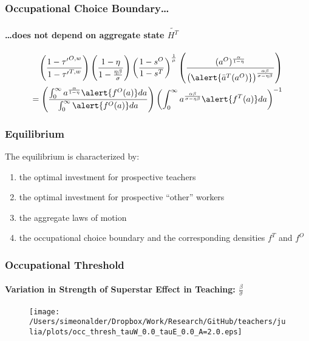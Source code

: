 \documentclass[11pt]{beamer}
\begin{document}

\begin{frame}
\frametitle{Occupational Choice Boundary\ldots}
\framesubtitle{\ldots does not depend on aggregate state $\widetilde{H^T}$} 
\begin{align}
\left(\frac{1-{\tau'}^{O,w}}{1-{\tau'}^{T,w}}\right) \left(\frac{1-\eta}{1-\tfrac{\eta\beta}{\sigma}}\right)  \left(\frac{1-s^{O}}{1-s^{T}}\right)^{\frac{1}{\mu}}  \left(\frac{(a^O)^\frac{\alpha}{1-\eta}}{\big(\alert{\bar{a}^T(a^O)}\big)^\frac{\alpha\beta}{\sigma-\eta\beta}}\right) \nonumber\\
= \left(\frac{\int_0^\infty a^\frac{\alpha}{1-\eta} \alert{f^O(a)} da}{\int_0^\infty \alert{f^O(a)} da} \right) \left(\int_0^\infty a^\frac{\alpha\beta}{\sigma-\eta\beta} \alert{f^T(a)} da\right)^{-1} \nonumber
\end{align}
\end{frame}

\begin{frame}
\frametitle{Equilibrium}
The equilibrium is characterized by:
\begin{enumerate}
  \item the optimal investment for prospective teachers 
  \item the optimal investment for prospective ``other'' workers
  \item the aggregate laws of motion
  \item the occupational choice boundary and the corresponding densities $f^T$ and $f^O$
\end{enumerate}
\end{frame}

\begin{frame}
\frametitle{Occupational Threshold}
\framesubtitle{Variation in Strength of Superstar Effect in Teaching: $\frac{\beta}{\sigma}$}
\begin{figure}
\begin{center}
\texttt{[image: /Users/simeonalder/Dropbox/Work/Research/GitHub/teachers/julia/plots/occ\_thresh\_tauW\_0.0\_tauE\_0.0\_A=2.0.eps]}
\end{center}
\end{figure}
\end{frame}
\end{document}
